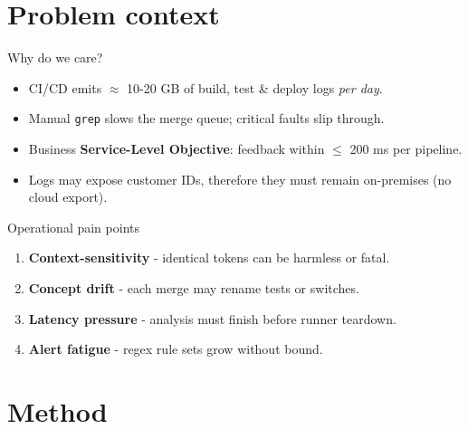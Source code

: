 \documentclass[15pt,aspectratio=169]{beamer}
\begin{document}
\section{Problem context}

\begin{frame}{Why do we care?}
\begin{itemize}[<+->]
  \item CI/CD emits \alert{$\approx$ 10-20 GB} of build, test \& deploy logs \textit{per day}. 
  \item Manual \texttt{grep} slows the merge queue; critical faults slip through.
  \item Business \textbf{Service-Level Objective}: feedback within \alert{\(\le\) 200 ms} per pipeline.
  \item Logs may expose customer IDs, therefore they must remain on-premises (no cloud export).
\end{itemize}
\end{frame}

\begin{frame}{Operational pain points}
\begin{enumerate}[<+->]
  \item \textbf{Context-sensitivity} - identical tokens can be harmless or fatal.
  \item \textbf{Concept drift} - each merge may rename tests or switches.
  \item \textbf{Latency pressure} - analysis must finish before runner teardown.
  \item \textbf{Alert fatigue} - regex rule sets grow without bound.
\end{enumerate}
\end{frame}



\section{Method}
\end{document}
